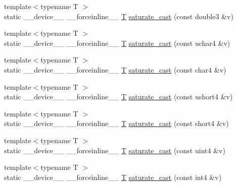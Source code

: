 \begin{DoxyCompactItemize}
\item 
{\footnotesize template$<$typename T $>$ }\\static \-\_\-\-\_\-device\-\_\-\-\_\- \-\_\-\-\_\-forceinline\-\_\-\-\_\- \hyperlink{calib3d_8hpp_a3efb9551a871ddd0463079a808916717}{T} \hyperlink{namespacecv_1_1gpu_1_1device_a68728503d9fc1a2102c0bd69bcb95e7c}{saturate\-\_\-cast} (const double3 \&v)
\item 
{\footnotesize template$<$typename T $>$ }\\static \-\_\-\-\_\-device\-\_\-\-\_\- \-\_\-\-\_\-forceinline\-\_\-\-\_\- \hyperlink{calib3d_8hpp_a3efb9551a871ddd0463079a808916717}{T} \hyperlink{namespacecv_1_1gpu_1_1device_a334a58d46cb6b3e082b37636908394d6}{saturate\-\_\-cast} (const uchar4 \&v)
\item 
{\footnotesize template$<$typename T $>$ }\\static \-\_\-\-\_\-device\-\_\-\-\_\- \-\_\-\-\_\-forceinline\-\_\-\-\_\- \hyperlink{calib3d_8hpp_a3efb9551a871ddd0463079a808916717}{T} \hyperlink{namespacecv_1_1gpu_1_1device_a35062a2d2e472327725c0836b60d361e}{saturate\-\_\-cast} (const char4 \&v)
\item 
{\footnotesize template$<$typename T $>$ }\\static \-\_\-\-\_\-device\-\_\-\-\_\- \-\_\-\-\_\-forceinline\-\_\-\-\_\- \hyperlink{calib3d_8hpp_a3efb9551a871ddd0463079a808916717}{T} \hyperlink{namespacecv_1_1gpu_1_1device_ad9467d2dea6ee0d88d97cdb488331603}{saturate\-\_\-cast} (const ushort4 \&v)
\item 
{\footnotesize template$<$typename T $>$ }\\static \-\_\-\-\_\-device\-\_\-\-\_\- \-\_\-\-\_\-forceinline\-\_\-\-\_\- \hyperlink{calib3d_8hpp_a3efb9551a871ddd0463079a808916717}{T} \hyperlink{namespacecv_1_1gpu_1_1device_a5a38b1c8a85acfd3050432cdc8bbdf98}{saturate\-\_\-cast} (const short4 \&v)
\item 
{\footnotesize template$<$typename T $>$ }\\static \-\_\-\-\_\-device\-\_\-\-\_\- \-\_\-\-\_\-forceinline\-\_\-\-\_\- \hyperlink{calib3d_8hpp_a3efb9551a871ddd0463079a808916717}{T} \hyperlink{namespacecv_1_1gpu_1_1device_ab4599535f7fc9e48d211d43a6f88387e}{saturate\-\_\-cast} (const uint4 \&v)
\item 
{\footnotesize template$<$typename T $>$ }\\static \-\_\-\-\_\-device\-\_\-\-\_\- \-\_\-\-\_\-forceinline\-\_\-\-\_\- \hyperlink{calib3d_8hpp_a3efb9551a871ddd0463079a808916717}{T} \hyperlink{namespacecv_1_1gpu_1_1device_ab2d032226070f3e351a3fb018e4babcf}{saturate\-\_\-cast} (const int4 \&v)

\end{DoxyCompactItemize}
